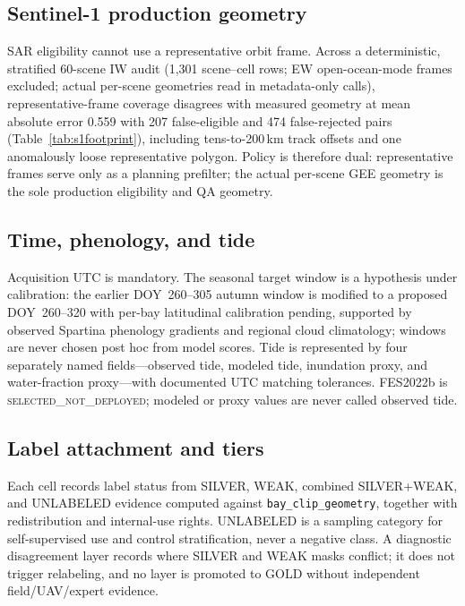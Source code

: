 \subsection{Sentinel-1 production geometry}
SAR eligibility cannot use a representative orbit frame. Across a
deterministic, stratified 60-scene IW audit (1{,}301 scene--cell rows;
EW open-ocean-mode frames excluded; actual per-scene geometries read in
metadata-only calls), representative-frame coverage disagrees with
measured geometry at mean absolute error 0.559 with 207 false-eligible
and 474 false-rejected pairs (Table~\ref{tab:s1footprint}), including
tens-to-200\,km track offsets and one anomalously loose representative
polygon. Policy is therefore dual: representative frames serve only as
a planning prefilter; the actual per-scene GEE geometry is the sole
production eligibility and QA geometry.



\subsection{Time, phenology, and tide}
Acquisition UTC is mandatory. The seasonal target window is a
hypothesis under calibration: the earlier DOY~260--305 autumn window
is modified to a proposed DOY~260--320 with per-bay latitudinal
calibration pending, supported by observed Spartina phenology gradients
\citep{zhang2022latitudinal} and regional cloud climatology; windows
are never chosen post hoc from model scores. Tide is represented by
four separately named fields---observed tide, modeled tide, inundation
proxy, and water-fraction proxy---with documented UTC matching
tolerances. FES2022b is \textsc{selected\_not\_deployed}; modeled or
proxy values are never called observed tide.

\subsection{Label attachment and tiers}
Each cell records label status from SILVER, WEAK, combined SILVER+WEAK,
and UNLABELED evidence computed against \texttt{bay\_clip\_geometry},
together with redistribution and internal-use rights. UNLABELED is a
sampling category for self-supervised use and control stratification,
never a negative class. A diagnostic disagreement layer records where
SILVER and WEAK masks conflict; it does not trigger relabeling, and no
layer is promoted to GOLD without independent field/UAV/expert evidence.
